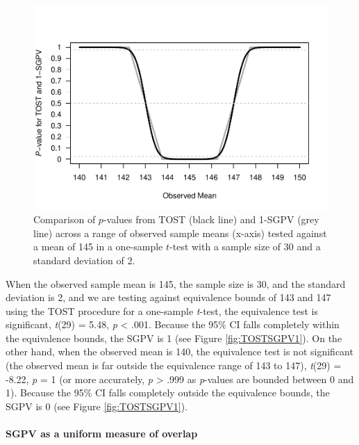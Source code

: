 \documentclass[
  english,
  man]{apa6}
\let\oldparagraph\paragraph
\renewcommand{\paragraph}[1]{\oldparagraph{#1}\mbox{}}
\begin{document}
\begin{figure}

{\centering \includegraphics[height=0.94\textheight]{chp5_format-Rmd_bib_files/figure-latex/TOSTSGPV2-1} 

}

\caption{Comparison of $p$-values from TOST (black line) and 1-SGPV (grey line) across a range of observed sample means (x-axis) tested against a mean of 145 in a one-sample $t$-test with a sample size of 30 and a standard deviation of 2.}\label{fig:TOSTSGPV2}
\end{figure}

When the observed sample mean is 145, the sample size is 30, and the standard deviation is 2, and we are testing against equivalence bounds of 143 and 147 using the TOST procedure for a one-sample \emph{t}-test, the equivalence test is significant, \emph{t}(29) = 5.48, \emph{p} \textless{} .001. Because the 95\(\%\) CI falls completely within the equivalence bounds, the SGPV is 1 (see Figure \ref{fig:TOSTSGPV1}).
On the other hand, when the observed mean is 140, the equivalence test is not significant (the observed mean is far outside the equivalence range of 143 to 147), \emph{t}(29) = -8.22, \emph{p} = 1 (or more accurately, \emph{p} \textgreater{} .999 as \emph{p}-values are bounded between 0 and 1). Because the 95\(\%\) CI falls completely outside the equivalence bounds, the SGPV is 0 (see Figure \ref{fig:TOSTSGPV1}).

\hypertarget{sgpv-as-a-uniform-measure-of-overlap}{%
\paragraph{SGPV as a uniform measure of overlap}\label{sgpv-as-a-uniform-measure-of-overlap}}
\end{document}
